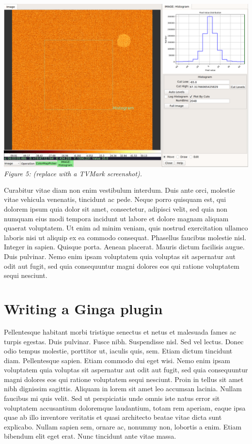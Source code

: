 \documentclass[]{article}
\begin{document}
\begin{multicols}{3}
\para
\begin{center}
\includegraphics[width=8in]{plugin_histogram} \\
\vspace*{0.4em}
\label{fig:plugin_histogram}
{\small\em Figure 5: (replace with a TVMark screenshot).} 
\end{center}

\para
Curabitur vitae diam non enim vestibulum interdum. Duis ante orci,
molestie vitae vehicula venenatis, tincidunt ac pede. Neque porro
quisquam est, qui dolorem ipsum quia dolor sit amet, consectetur,
adipisci velit, sed quia non numquam eius modi tempora incidunt ut
labore et dolore magnam aliquam quaerat voluptatem. Ut enim ad minim
veniam, quis nostrud exercitation ullamco laboris nisi ut aliquip ex ea
commodo consequat. Phasellus faucibus molestie nisl. Integer in
sapien. Quisque porta. Aenean placerat. Mauris dictum facilisis
augue. Duis pulvinar. Nemo enim ipsam voluptatem quia voluptas sit
aspernatur aut odit aut fugit, sed quia consequuntur magni dolores eos
qui ratione voluptatem sequi nesciunt. 

\section*{Writing a Ginga plugin}

\para
Pellentesque habitant morbi tristique senectus et netus et malesuada
fames ac turpis egestas. Duis pulvinar. Fusce nibh. Suspendisse
nisl. Sed vel lectus. Donec odio tempus molestie, porttitor ut, iaculis
quis, sem. Etiam dictum tincidunt diam. Pellentesque sapien. Etiam
commodo dui eget wisi. Nemo enim ipsam voluptatem quia voluptas sit
aspernatur aut odit aut fugit, sed quia consequuntur magni dolores eos
qui ratione voluptatem sequi nesciunt. Proin in tellus sit amet nibh
dignissim sagittis. Aliquam in lorem sit amet leo accumsan
lacinia. Nullam faucibus mi quis velit. Sed ut perspiciatis unde omnis
iste natus error sit voluptatem accusantium doloremque laudantium, totam
rem aperiam, eaque ipsa quae ab illo inventore veritatis et quasi
architecto beatae vitae dicta sunt explicabo. Nullam sapien sem, ornare
ac, nonummy non, lobortis a enim. Etiam bibendum elit eget erat. Nunc
tincidunt ante vitae massa.


\end{multicols}
\end{document}

